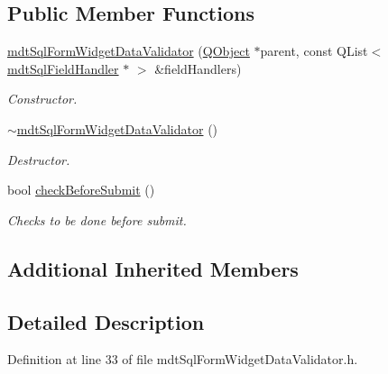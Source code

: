 \subsection*{Public Member Functions}
\begin{DoxyCompactItemize}
\item 
\hyperlink{classmdt_sql_form_widget_data_validator_af26a73385c7e737abb2dbc39e7301cfa}{mdt\-Sql\-Form\-Widget\-Data\-Validator} (\hyperlink{class_q_object}{Q\-Object} $\ast$parent, const Q\-List$<$ \hyperlink{classmdt_sql_field_handler}{mdt\-Sql\-Field\-Handler} $\ast$ $>$ \&field\-Handlers)
\begin{DoxyCompactList}\small\item\em Constructor. \end{DoxyCompactList}\item 
\hyperlink{classmdt_sql_form_widget_data_validator_aec2505ec4b25b1fae3e37cd13f4afe07}{$\sim$mdt\-Sql\-Form\-Widget\-Data\-Validator} ()
\begin{DoxyCompactList}\small\item\em Destructor. \end{DoxyCompactList}\item 
bool \hyperlink{classmdt_sql_form_widget_data_validator_aa577e4acf4d0f371c45a67c18c59a924}{check\-Before\-Submit} ()
\begin{DoxyCompactList}\small\item\em Checks to be done before submit. \end{DoxyCompactList}\end{DoxyCompactItemize}
\subsection*{Additional Inherited Members}


\subsection{Detailed Description}


Definition at line 33 of file mdt\-Sql\-Form\-Widget\-Data\-Validator.\-h.



